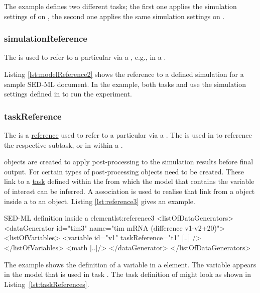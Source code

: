 The example defines two different tasks; the first one applies the simulation settings of  on , the second one applies the same simulation settings on .


\subsubsection{simulationReference}
\label{sec:simulationReference}
The  is used to refer to a particular \Simulation  via a \SIdRef, e.g., in a \Task. 

Listing \ref{lst:modelReference2} shows the reference to a defined simulation for a sample SED-ML document. In the example, both tasks  and  use the simulation settings defined in  to run the experiment.


\subsubsection{taskReference}
\label{sec:taskReference}
The  is a \hyperref[sec:reference]{reference} used to refer to a particular \AbstractTask via a \SIdRef. The  is used in \SubTask to reference the respective subtask, or in \Variable within a \DataGenerator.

\DataGenerator objects are created to apply post-processing to the simulation results before final output. 
For certain types of post-processing \Variable objects need to be created.
These link to a \hyperref[class:abstractTask]{task} defined within the \ListOfTasks from which the model that contains the variable of interest can be inferred. A  association is used to realise that link from a \Variable object inside a \DataGenerator to an \AbstractTask object. Listing \ref{lst:reference3} gives an example.

\begin{myXmlLst}{SED-ML  definition inside a  element}{lst:reference3}
<listOfDataGenerators>
	<dataGenerator id="tim3" name="tim mRNA (difference v1-v2+20)">
	<listOfVariables>
   		<variable id="v1" taskReference="t1" [..] />
  	</listOfVariables>
  	<math [..]/>
	</dataGenerator>
</listOfDataGenerators>
\end{myXmlLst}

The example shows the definition of a variable  in a  element. The variable appears in the model that is used in task . The task definition of  might look as shown in Listing~\ref{lst:taskReferences}.


